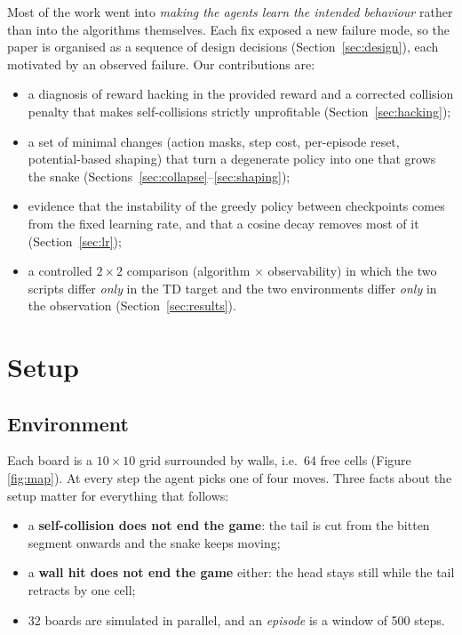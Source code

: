 \documentclass{article}
\begin{document}
Most of the work went into \emph{making the agents learn the intended behaviour} rather than into the algorithms themselves.
Each fix exposed a new failure mode, so the paper is organised as a sequence of design decisions (Section~\ref{sec:design}), each motivated by an observed failure.
Our contributions are:
\begin{itemize}
\item a diagnosis of reward hacking in the provided reward and a corrected collision penalty that makes self-collisions strictly unprofitable (Section~\ref{sec:hacking});
\item a set of minimal changes (action masks, step cost, per-episode reset, potential-based shaping) that turn a degenerate policy into one that grows the snake (Sections~\ref{sec:collapse}--\ref{sec:shaping});
\item evidence that the instability of the greedy policy between checkpoints comes from the fixed learning rate, and that a cosine decay removes most of it (Section~\ref{sec:lr});
\item a controlled $2\times2$ comparison (algorithm $\times$ observability) in which the two scripts differ \emph{only} in the TD target and the two environments differ \emph{only} in the observation (Section~\ref{sec:results}).
\end{itemize}

\section{Setup}
\label{sec:setup}

\subsection{Environment}
Each board is a $10\times10$ grid surrounded by walls, i.e.\ 64 free cells (Figure \ref{fig:map}).
At every step the agent picks one of four moves.
Three facts about the setup matter for everything that follows:
\begin{itemize}
\item a \textbf{self-collision does not end the game}: the tail is cut from the bitten segment onwards and the snake keeps moving;
\item a \textbf{wall hit does not end the game} either: the head stays still while the tail retracts by one cell;
\item 32 boards are simulated in parallel, and an \emph{episode} is a window of 500 steps.
\end{itemize}
\end{document}
